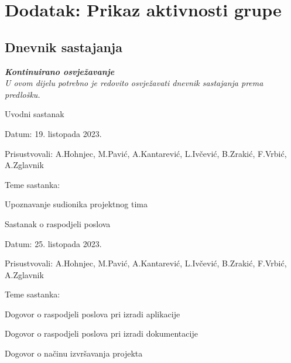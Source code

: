 \chapter*{Dodatak: Prikaz aktivnosti grupe}
		
		\section*{Dnevnik sastajanja}
		
		\textbf{\textit{Kontinuirano osvježavanje}}\\
		
		 \textit{U ovom dijelu potrebno je redovito osvježavati dnevnik sastajanja prema predlošku.}
		
		\begin{packed_enum}
			\item  Uvodni sastanak
			
			\item[] \begin{packed_item}
				\item Datum: 19. listopada 2023.
				\item Prisustvovali: A.Hohnjec, M.Pavić, A.Kantarević, L.Ivčević, B.Zrakić, F.Vrbić, A.Zglavnik
				\item Teme sastanka:
				\begin{packed_item}
					\item  Upoznavanje sudionika projektnog tima
				\end{packed_item}
			\end{packed_item}
			
			\item  Sastanak o raspodjeli poslova
			
			\item[] \begin{packed_item}
				\item Datum: 25. listopada 2023.
				\item Prisustvovali: A.Hohnjec, M.Pavić, A.Kantarević, L.Ivčević, B.Zrakić, F.Vrbić, A.Zglavnik
				\item Teme sastanka:
				\begin{packed_item}
					\item  Dogovor o raspodjeli poslova pri izradi aplikacije
					\item  Dogovor o raspodjeli poslova pri izradi dokumentacije
					\item  Dogovor o načinu izvršavanja projekta
				\end{packed_item}
			\end{packed_item}
			

\end{packed_enum}
